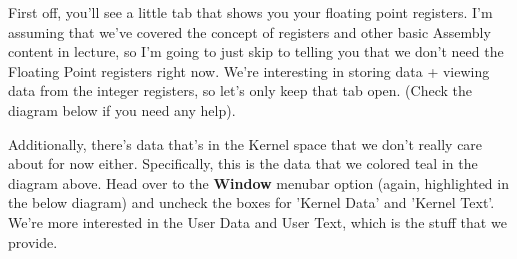 \documentclass[english, 10pt]{article}
\begin{document}
First off, you'll see a little tab that shows you your floating point registers. I'm assuming that we've covered the concept of registers and other basic Assembly content in lecture, so I'm going to just skip to telling you that we don't need the Floating Point registers right now. We're interesting in storing data + viewing data from the integer registers, so let's only keep that tab open. (Check the diagram below if you need any help).\newline

Additionally, there's data that's in the Kernel space that we don't really care about for now either. Specifically, this is the data that we colored teal in the diagram above. Head over to the \textbf{Window} menubar option (again, highlighted in the below diagram) and uncheck the boxes for 'Kernel Data' and 'Kernel Text'. We're more interested in the User Data and User Text, which is the stuff that we provide.\newline 
\end{document}
